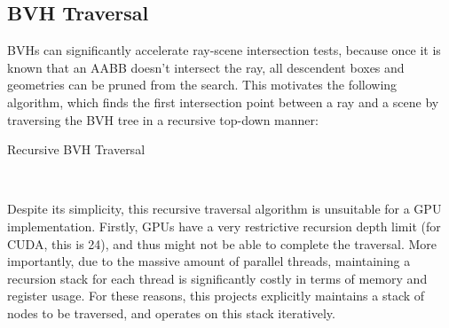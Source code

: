 \subsection{BVH Traversal}
BVHs can significantly accelerate ray-scene intersection tests, because once it is known that an AABB doesn't intersect the ray, all descendent boxes and geometries can be pruned from the search. This motivates the following algorithm, which finds the first intersection point between a ray and a scene by traversing the BVH tree in a recursive top-down manner:

\begin{algorithm}[H]
    \label{algo bvh traversal recursive}
    \caption{Recursive BVH Traversal}
\end{algorithm} 

~

Despite its simplicity, this recursive traversal algorithm is unsuitable for a GPU implementation. Firstly, GPUs have a very restrictive recursion depth limit (for CUDA, this is 24), and thus might not be able to complete the traversal. More importantly, due to the massive amount of parallel threads, maintaining a recursion stack for each thread is significantly costly in terms of memory and register usage. For these reasons, this projects explicitly maintains a stack of nodes to be traversed, and operates on this stack iteratively.

